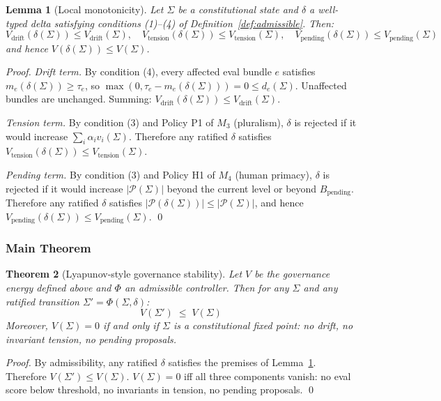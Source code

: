 \documentclass[11pt]{article}
\newtheorem{theorem}{Theorem}[section]
\newtheorem{lemma}[theorem]{Lemma}
\begin{document}
\begin{lemma}[Local monotonicity]
\label{lem:local}
Let $\Sigma$ be a constitutional state and $\delta$ a well-typed
delta satisfying conditions (1)--(4) of Definition~\ref{def:admissible}.
Then:
\[
  V_{\mathrm{drift}}(\delta(\Sigma)) \leq V_{\mathrm{drift}}(\Sigma),
  \quad
  V_{\mathrm{tension}}(\delta(\Sigma)) \leq V_{\mathrm{tension}}(\Sigma),
  \quad
  V_{\mathrm{pending}}(\delta(\Sigma)) \leq V_{\mathrm{pending}}(\Sigma)
\]
and hence $V(\delta(\Sigma)) \leq V(\Sigma)$.
\end{lemma}

\begin{proof}
\textit{Drift term.} By condition (4), every affected eval bundle
$e$ satisfies $m_e(\delta(\Sigma)) \geq \tau_e$, so
$\max(0, \tau_e - m_e(\delta(\Sigma))) = 0 \leq d_e(\Sigma)$.
Unaffected bundles are unchanged. Summing: $V_{\mathrm{drift}}(\delta(\Sigma)) \leq V_{\mathrm{drift}}(\Sigma)$.

\textit{Tension term.} By condition (3) and Policy P1 of $M_3$
(pluralism), $\delta$ is rejected if it would increase
$\sum_i \alpha_i v_i(\Sigma)$. Therefore any ratified $\delta$
satisfies $V_{\mathrm{tension}}(\delta(\Sigma)) \leq V_{\mathrm{tension}}(\Sigma)$.

\textit{Pending term.} By condition (3) and Policy H1 of $M_4$
(human primacy), $\delta$ is rejected if it would increase
$|\mathcal{P}(\Sigma)|$ beyond the current level or beyond
$B_{\mathrm{pending}}$. Therefore any ratified $\delta$ satisfies
$|\mathcal{P}(\delta(\Sigma))| \leq |\mathcal{P}(\Sigma)|$, and
hence $V_{\mathrm{pending}}(\delta(\Sigma)) \leq V_{\mathrm{pending}}(\Sigma)$. \qed
\end{proof}

\subsubsection{Main Theorem}

\begin{theorem}[Lyapunov-style governance stability]
\label{thm:lyapunov}
Let $V$ be the governance energy defined above and $\Phi$ an
admissible controller. Then for any $\Sigma$ and any ratified
transition $\Sigma' = \Phi(\Sigma, \delta)$:
\[
  V(\Sigma') \;\leq\; V(\Sigma)
\]
Moreover, $V(\Sigma) = 0$ if and only if $\Sigma$ is a
\emph{constitutional fixed point}: no drift, no invariant tension,
no pending proposals.
\end{theorem}

\begin{proof}
By admissibility, any ratified $\delta$ satisfies the premises
of Lemma~\ref{lem:local}. Therefore $V(\Sigma') \leq V(\Sigma)$.
$V(\Sigma) = 0$ iff all three components vanish: no eval score
below threshold, no invariants in tension, no pending proposals. \qed
\end{proof}
\end{document}
